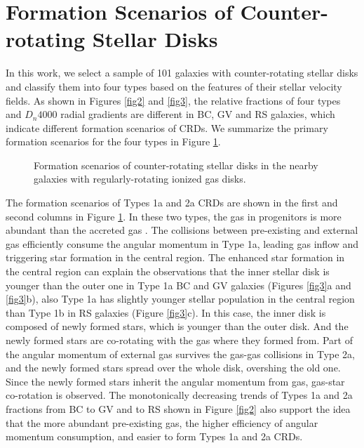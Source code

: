 \documentclass{aastex631}
\begin{document}
\section{Formation Scenarios of Counter-rotating Stellar Disks} \label{sec:conclusions}

In this work, we select a sample of 101 galaxies with counter-rotating stellar disks and classify them into four types based on the features of their stellar velocity fields. As shown in Figures \ref{fig2} and \ref{fig3}, the relative fractions of four types and $D_{n}4000$ radial gradients are different in BC, GV and RS galaxies, which indicate different formation scenarios of CRDs. We summarize the primary formation scenarios for the four types in Figure \ref{fig4}.

\begin{figure}[ht!]
    \caption{Formation scenarios of counter-rotating stellar disks in the nearby galaxies with regularly-rotating ionized gas disks. \label{fig4}}
\end{figure}

The formation scenarios of Types 1a and 2a CRDs are shown in the first and second columns in Figure \ref{fig4}. In these two types, the gas in progenitors is more abundant than the accreted gas \citep{2004A&A...424..447P}. The collisions between pre-existing and external gas efficiently consume the angular momentum in Type 1a, leading gas inflow and triggering star formation in the central region. The enhanced star formation in the central region can explain the observations that the inner stellar disk is younger than the outer one in Type 1a BC and GV galaxies (Figures \ref{fig3}a and \ref{fig3}b), also Type 1a has slightly younger stellar population in the central region than Type 1b in RS galaxies (Figure \ref{fig3}c). In this case, the inner disk is composed of newly formed stars, which is younger than the outer disk. And the newly formed stars are co-rotating with the gas where they formed from. Part of the angular momentum of external gas survives the gas-gas collisions in Type 2a, and the newly formed stars spread over the whole disk, overshing the old one. Since the newly formed stars inherit the angular momentum from gas, gas-star co-rotation is observed. The monotonically decreasing trends of Types 1a and 2a fractions from BC to GV and to RS shown in Figure \ref{fig2} also support the idea that the more abundant pre-existing gas, the higher efficiency of angular momentum consumption, and easier to form Types 1a and 2a CRDs.
\end{document}
